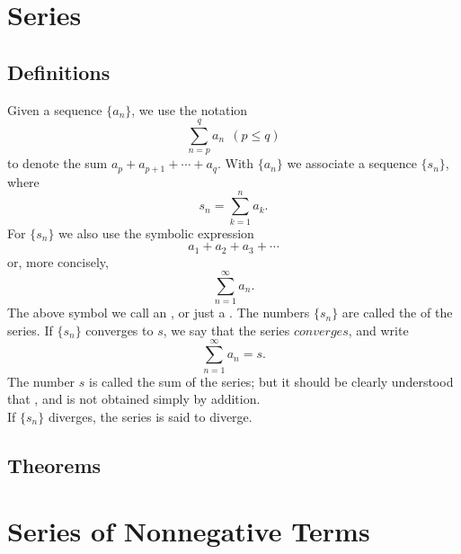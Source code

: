 \section{Series}
\subsection{Definitions}
\begin{deff}
	Given a sequence $\{a_n\}$, we use the notation $$\sum^q_{n=p} a_n ~~(p\leq q)$$ to denote the sum $a_p+a_{p+1}+\cdots+a_q$. With $\{a_n\}$ we associate a sequence $\{s_n\}$, where $$s_n=\sum_{k=1}^n a_k.$$
	For $\{s_n\}$ we also use the symbolic expression $$a_1+a_2+a_3+\cdots$$ or, more concisely, $$\sum_{n=1}^\infty a_n.$$ The above symbol we call an {}, or just a {}. The numbers $\{s_n\}$ are called the {} of the series. If $\{s_n\}$ converges to $s$, we say that the series $converges$, and write $$\sum_{n=1}^\infty a_n =s.$$ The number $s$ is called the sum of the series; but it should be clearly understood that {}, and is not obtained simply by addition.\\
	If $\{s_n\}$ diverges, the series is said to diverge.
\end{deff}

\subsection{Theorems}




\section{Series of Nonnegative Terms}
